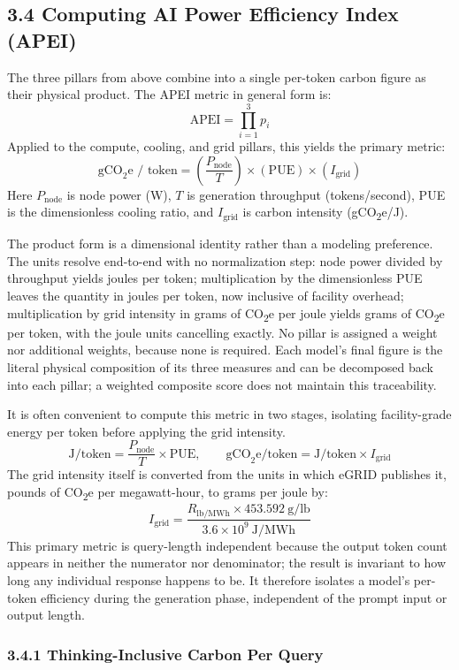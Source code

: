 \documentclass[11pt]{article}
\newcommand{\cotwo}{CO\textsubscript{2}}     %
\begin{document}
\subsection*{3.4 Computing AI Power Efficiency Index (APEI)}

The three pillars from above combine into a single per-token carbon figure as their physical product. The APEI metric in general form is:
\[
\text{APEI} = \prod_{i=1}^{3} p_i
\]
Applied to the compute, cooling, and grid pillars, this yields the primary metric:
\[
\text{gCO}_2\text{e / token} = \left(\frac{P_{\text{node}}}{T}\right) \times (\text{PUE}) \times (I_{\text{grid}})
\]
Here $P_{\text{node}}$ is node power (W), $T$ is generation throughput (tokens/second), PUE is the dimensionless cooling ratio, and $I_{\text{grid}}$ is carbon intensity (g\cotwo e/J).

The product form is a dimensional identity rather than a modeling preference. The units resolve end-to-end with no normalization step: node power divided by throughput yields joules per token; multiplication by the dimensionless PUE leaves the quantity in joules per token, now inclusive of facility overhead; multiplication by grid intensity in grams of \cotwo e per joule yields grams of \cotwo e per token, with the joule units cancelling exactly. No pillar is assigned a weight nor additional weights, because none is required. Each model's final figure is the literal physical composition of its three measures and can be decomposed back into each pillar; a weighted composite score does not maintain this traceability.

It is often convenient to compute this metric in two stages, isolating facility-grade energy per token before applying the grid intensity.
\[
\text{J/token} = \frac{P_{\text{node}}}{T} \times \text{PUE}, \qquad
\text{gCO}_2\text{e/token} = \text{J/token} \times I_{\text{grid}}
\]
The grid intensity itself is converted from the units in which eGRID publishes it, pounds of \cotwo e per megawatt-hour, to grams per joule by:
\[
I_{\text{grid}} = \frac{R_{\text{lb/MWh}} \times 453.592\ \text{g/lb}}{3.6 \times 10^{9}\ \text{J/MWh}}
\]
This primary metric is query-length independent because the output token count appears in neither the numerator nor denominator; the result is invariant to how long any individual response happens to be. It therefore isolates a model's per-token efficiency during the generation phase, independent of the prompt input or output length.

\subsubsection*{3.4.1 Thinking-Inclusive Carbon Per Query}
\end{document}
